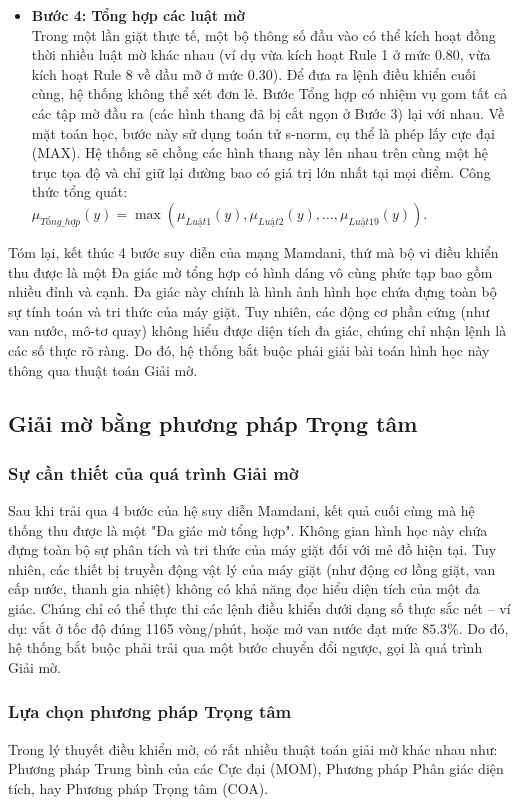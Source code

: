 \documentclass[12pt, a4paper]{article}
\begin{document}
\begin{itemize}
    \item \textbf{Bước 4: Tổng hợp các luật mờ}\\
    Trong một lần giặt thực tế, một bộ thông số đầu vào có thể kích hoạt đồng thời nhiều luật mờ khác nhau (ví dụ vừa kích hoạt Rule 1 ở mức $0.80$, vừa kích hoạt Rule 8 về dầu mỡ ở mức $0.30$). Để đưa ra lệnh điều khiển cuối cùng, hệ thống không thể xét đơn lẻ. Bước Tổng hợp có nhiệm vụ gom tất cả các tập mờ đầu ra (các hình thang đã bị cắt ngọn ở Bước 3) lại với nhau. Về mặt toán học, bước này sử dụng toán tử s-norm, cụ thể là phép lấy cực đại (MAX). Hệ thống sẽ chồng các hình thang này lên nhau trên cùng một hệ trục tọa độ và chỉ giữ lại đường bao có giá trị lớn nhất tại mọi điểm. Công thức tổng quát: $\mu_{Tổng\_hợp}(y) = \max (\mu_{Luật1}(y), \mu_{Luật2}(y), \dots, \mu_{Luật19}(y))$.
\end{itemize}

Tóm lại, kết thúc 4 bước suy diễn của mạng Mamdani, thứ mà bộ vi điều khiển thu được là một Đa giác mờ tổng hợp có hình dáng vô cùng phức tạp bao gồm nhiều đỉnh và cạnh. Đa giác này chính là hình ảnh hình học chứa đựng toàn bộ sự tính toán và tri thức của máy giặt. Tuy nhiên, các động cơ phần cứng (như van nước, mô-tơ quay) không hiểu được diện tích đa giác, chúng chỉ nhận lệnh là các số thực rõ ràng. Do đó, hệ thống bắt buộc phải giải bài toán hình học này thông qua thuật toán Giải mờ.

\subsection{Giải mờ bằng phương pháp Trọng tâm}
\subsubsection{Sự cần thiết của quá trình Giải mờ}
Sau khi trải qua 4 bước của hệ suy diễn Mamdani, kết quả cuối cùng mà hệ thống thu được là một "Đa giác mờ tổng hợp". Không gian hình học này chứa đựng toàn bộ sự phân tích và tri thức của máy giặt đối với mẻ đồ hiện tại. Tuy nhiên, các thiết bị truyền động vật lý của máy giặt (như động cơ lồng giặt, van cấp nước, thanh gia nhiệt) không có khả năng đọc hiểu diện tích của một đa giác. Chúng chỉ có thể thực thi các lệnh điều khiển dưới dạng số thực sắc nét – ví dụ: vắt ở tốc độ đúng 1165 vòng/phút, hoặc mở van nước đạt mức $85.3\%$. Do đó, hệ thống bắt buộc phải trải qua một bước chuyển đổi ngược, gọi là quá trình Giải mờ.

\subsubsection{Lựa chọn phương pháp Trọng tâm}
Trong lý thuyết điều khiển mờ, có rất nhiều thuật toán giải mờ khác nhau như: Phương pháp Trung bình của các Cực đại (MOM), Phương pháp Phân giác diện tích, hay Phương pháp Trọng tâm (COA).
\end{document}
